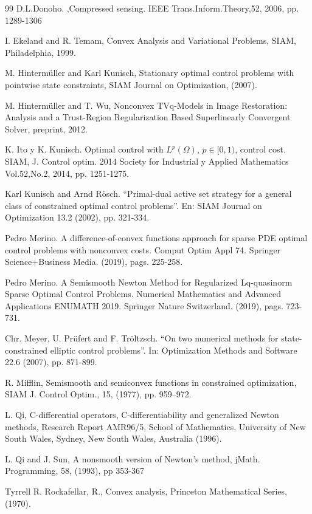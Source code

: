 \documentclass[11pt,a4paper]{amsart}
\newcommand{\om}{\Omega}
\begin{document}
\begin{thebibliography}{99}
D.L.Donoho. ,Compressed sensing. IEEE Trans.Inform.Theory,52, 2006, pp. 1289-1306

I. Ekeland and R. Temam, Convex Analysis and Variational Problems, SIAM, Philadelphia, 1999.

M. Hintermüller and Karl Kunisch, Stationary optimal control problems with pointwise state constraints, SIAM Journal on Optimization, (2007). 

M. Hintermüller and T. Wu, Nonconvex TVq-Models in Image Restoration: Analysis and
a Trust-Region Regularization Based Superlinearly Convergent Solver, preprint, 2012.

K. Ito y K. Kunisch. Optimal control with $L^p(\om)$, $p \in [0,1)$, control cost. SIAM, J. Control optim. 2014 Society for Industrial y Applied Mathematics Vol.52,No.2,
2014, pp. 1251-1275.

Karl Kunisch and Arnd Rösch. “Primal-dual active set strategy for a general class
of constrained optimal control problems”. En: SIAM Journal on Optimization 13.2
(2002), pp. 321-334.

Pedro Merino. A difference-of-convex functions approach for sparse PDE optimal control problems with nonconvex costs. Comput Optim Appl 74. Springer Science+Business Media. (2019), pags. 225-258.

Pedro Merino. A Semismooth Newton Method for Regularized Lq-quasinorm Sparse Optimal Control Problems. Numerical Mathematics and Advanced Applications ENUMATH 2019. Springer Nature Switzerland. (2019), pags. 723-731.

Chr. Meyer, U. Prüfert and F. Tröltzsch. “On two numerical methods for state-
constrained elliptic control problems”. In: Optimization Methods and Software 22.6
(2007), pp. 871-899.

R. Mifflin, Semismooth and semiconvex functions in constrained optimization, SIAM J. Control Optim., 15, (1977), pp. 959–972.

L. Qi, C-differential operators, C-differentiability and generalized Newton methods, Research Report
AMR96/5, School of Mathematics, University of New South Wales, Sydney, New South Wales, Australia (1996).


L. Qi and J. Sun, A nonsmooth version of Newton’s method,
jMath. Programming, 58, (1993), pp 353-367

Tyrrell R. Rockafellar, R., Convex analysis, Princeton Mathematical Series, (1970).


\end{thebibliography}
\end{document}
